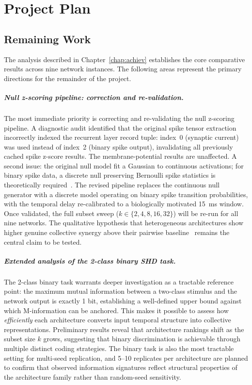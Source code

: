 \documentclass[12pt,twoside]{report}
\begin{document}
\chapter{Project Plan}
\label{chap:plan}

\section{Remaining Work}

The analysis described in Chapter~\ref{chap:achiev} establishes the core 
comparative results across nine network instances. The following areas represent 
the primary directions for the remainder of the project.

\paragraph{Null z-scoring pipeline: correction and re-validation.}
\label{sec:zscore_plan}
The most immediate priority is correcting and re-validating the null z-scoring
pipeline. A diagnostic audit identified that the original spike tensor extraction
incorrectly indexed the recurrent layer record tuple: index~0 (synaptic current) was
used instead of index~2 (binary spike output), invalidating all previously cached
spike z-score results. The membrane-potential results are unaffected. A second issue:
the original null model fit a Gaussian to continuous activations; for binary spike
data, a discrete null preserving Bernoulli spike statistics is theoretically
required~\cite{liarinull}. The revised pipeline replaces the continuous null generator
with a discrete model operating on binary spike transition probabilities, with the
temporal delay re-calibrated to a biologically motivated 15~ms window. Once
validated, the full subset sweep ($k \in \{2, 4, 8, 16, 32\}$) will be re-run for
all nine networks. The qualitative hypothesis that heterogeneous architectures show
higher genuine collective synergy above their pairwise
baseline~\cite{liarinull, liardiscalable} remains the central claim to be tested.

\paragraph{Extended analysis of the 2-class binary SHD task.}
The 2-class binary task warrants deeper investigation as a tractable reference
point: the maximum mutual information between a two-class stimulus and the network
output is exactly 1 bit, establishing a well-defined upper bound against which
M-information can be anchored. This makes it possible to assess how
\emph{efficiently} each architecture converts input temporal structure into
collective representations. Preliminary results reveal that architecture rankings
shift as the subset size $k$ grows, suggesting that binary discrimination is
achievable through multiple distinct coding strategies. The binary task is also the
most tractable setting for multi-seed replication, and 5--10 replicates per
architecture are planned to confirm that observed information signatures reflect
structural properties of the architecture family rather than random-seed sensitivity.
\end{document}
